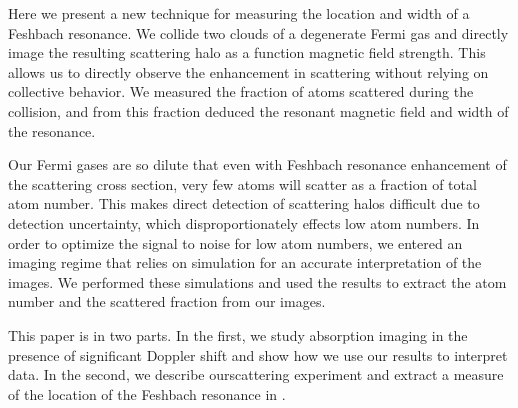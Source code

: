 \documentclass[12pt]{iopart}
\begin{document}
\par Here we present a new technique for measuring the location and width of a Feshbach resonance. We collide two clouds of a degenerate Fermi gas and directly image the resulting \swave scattering halo as a function magnetic field strength. This allows us to directly observe the enhancement in scattering without relying on collective behavior. We measured the fraction of atoms scattered during the collision, and from this fraction deduced the resonant magnetic field  and width of the resonance.
\par Our Fermi gases are so dilute that even with Feshbach resonance enhancement of the scattering cross section, very few atoms will scatter as a fraction of total atom number. This makes direct detection of \swave scattering halos difficult due to detection uncertainty, which disproportionately effects low atom numbers. In order to optimize the signal to noise for low atom numbers, we entered an imaging regime that relies on simulation for an accurate interpretation of the images. We performed these simulations and used the results to extract the atom number and the scattered fraction from our images.
\par This paper is in two parts. In the first, we study absorption imaging in the presence of significant Doppler shift and show how we use our results to interpret data. In the second, we describe our\swave scattering experiment and extract a measure of the location of the Feshbach resonance in \K. 
\end{document}
